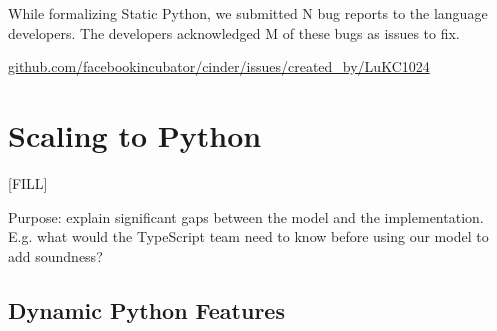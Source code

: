 \documentclass[english,cleveref,submission]{programming}
\newcommand{\shorturl}[2]{\href{#1#2}{#2}}
\begin{document}
While formalizing Static Python, we submitted N bug reports to the language developers.
The developers acknowledged M of these bugs as issues to fix.

\begin{center}
  \shorturl{https://}{github.com/facebookincubator/cinder/issues/created\_by/LuKC1024}
\end{center}


\section{Scaling to Python}
\label{s:impl}






[FILL]

Purpose: explain significant gaps between the model and the implementation.
E.g. what would the TypeScript team need to know before using our model
to add soundness?

\subsection{Dynamic Python Features}
\end{document}
